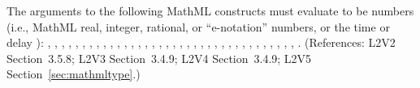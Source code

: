 The arguments to the following MathML constructs must evaluate to be
numbers (i.e., MathML real, integer, rational, or
``e-notation'' numbers, or the time or delay ):
, , , , ,
, , , , ,
, , , ,
, , , , ,
, , , , ,
, , , ,
, , , ,
, , , ,
.  (References: L2V2 Section~3.5.8; L2V3 Section~3.4.9; L2V4 Section~3.4.9;
L2V5 Section~\ref{sec:mathmltype}.)
